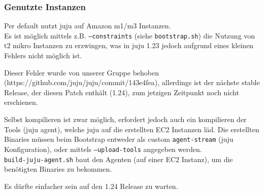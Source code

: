 \subsubsection{Genutzte Instanzen}

Per default nutzt juju auf Amazon m1/m3 Instanzen. \\
Es ist möglich mittels z.B. \texttt{--constraints} (siehe \texttt{bootstrap.sh}) die Nutzung von t2 mikro Instanzen zu erzwingen, was in juju 1.23 jedoch aufgrund eines kleinen Fehlers nicht möglich ist.

Dieser Fehler wurde von unserer Gruppe behoben (https://github.com/juju/juju/commit/143e4fea), allerdings ist der nächste stable Release, der diesen Patch enthält (1.24), zum jetzigen Zeitpunkt noch nicht erschienen.

Selbst kompilieren ist zwar möglich, erfordert jedoch auch ein kompilieren der Tools (juju agent), welche juju auf die erstellten EC2 Instanzen läd.
Die erstellten Binaries müssen beim Bootstrap entweder als custom \texttt{agent-stream} (juju Konfiguration), oder mittels \texttt{--upload-tools} angegeben werden. \\
\texttt{build-juju-agent.sh} baut den Agenten (auf einer EC2 Instanz), um die benötigten Binaries zu bekommen.

Es dürfte einfacher sein auf den 1.24 Release zu warten.
